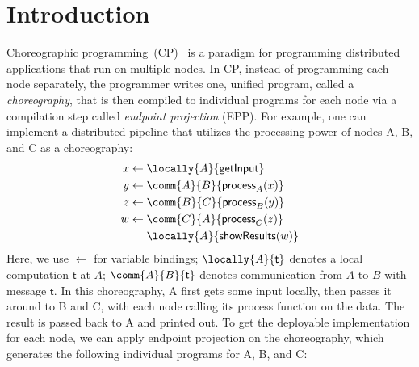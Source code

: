 \section{Introduction}

Choreographic programming~(CP)~\citep{montesi-2013, montesi-2023} is a paradigm for programming distributed applications that run on multiple nodes.
%
In CP, instead of programming each node separately, the programmer writes one, unified program, called a \emph{choreography}, that is then compiled to individual programs for each node via a compilation step called \emph{endpoint projection} (EPP).
%
For example, one can implement a distributed pipeline that utilizes the processing power of nodes A, B, and C as a choreography:
%
\begin{equation*}
  \begin{split}
    x \leftarrow \; & \locally{A}{\mathsf{getInput}} \\
    y \leftarrow \; & \comm{A}{B}{\mathsf{process}_A(x)} \\
    z \leftarrow \; & \comm{B}{C}{\mathsf{process}_B(y)} \\
    w \leftarrow \; & \comm{C}{A}{\mathsf{process}_C(z)} \\
                    & \locally{A}{\mathsf{showResults}(w)} \\
  \end{split}
\end{equation*}
%
Here, we use $\leftarrow$ for variable bindings;
%
$\locally{A}{\mathsf{t}}$ denotes a local computation $\mathsf{t}$ at $A$;
%
$\comm{A}{B}{\mathsf{t}}$ denotes communication from $A$ to $B$ with message $\mathsf{t}$.
%
In this choreography, A first gets some input locally, then passes it around to B and C, with each node calling its process function on the data.
%
The result is passed back to A and printed out.
%
To get the deployable implementation for each node, we can apply endpoint projection on the choreography, which generates the following individual programs for A, B, and C:
%
